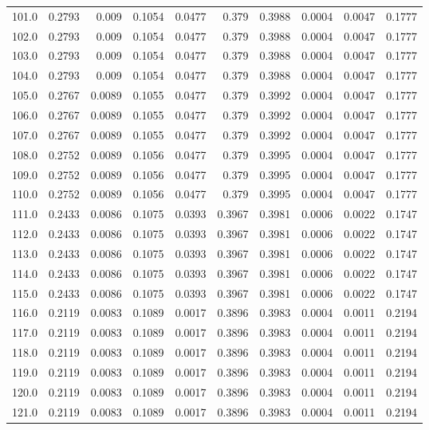 \begin{longtable}{lrrrrrrrrr}
101.0 & 0.2793 & 0.009 & 0.1054 & 0.0477 & 0.379 & 0.3988 & 0.0004 & 0.0047 & 0.1777 \\
102.0 & 0.2793 & 0.009 & 0.1054 & 0.0477 & 0.379 & 0.3988 & 0.0004 & 0.0047 & 0.1777 \\
103.0 & 0.2793 & 0.009 & 0.1054 & 0.0477 & 0.379 & 0.3988 & 0.0004 & 0.0047 & 0.1777 \\
104.0 & 0.2793 & 0.009 & 0.1054 & 0.0477 & 0.379 & 0.3988 & 0.0004 & 0.0047 & 0.1777 \\
105.0 & 0.2767 & 0.0089 & 0.1055 & 0.0477 & 0.379 & 0.3992 & 0.0004 & 0.0047 & 0.1777 \\
106.0 & 0.2767 & 0.0089 & 0.1055 & 0.0477 & 0.379 & 0.3992 & 0.0004 & 0.0047 & 0.1777 \\
107.0 & 0.2767 & 0.0089 & 0.1055 & 0.0477 & 0.379 & 0.3992 & 0.0004 & 0.0047 & 0.1777 \\
108.0 & 0.2752 & 0.0089 & 0.1056 & 0.0477 & 0.379 & 0.3995 & 0.0004 & 0.0047 & 0.1777 \\
109.0 & 0.2752 & 0.0089 & 0.1056 & 0.0477 & 0.379 & 0.3995 & 0.0004 & 0.0047 & 0.1777 \\
110.0 & 0.2752 & 0.0089 & 0.1056 & 0.0477 & 0.379 & 0.3995 & 0.0004 & 0.0047 & 0.1777 \\
111.0 & 0.2433 & 0.0086 & 0.1075 & 0.0393 & 0.3967 & 0.3981 & 0.0006 & 0.0022 & 0.1747 \\
112.0 & 0.2433 & 0.0086 & 0.1075 & 0.0393 & 0.3967 & 0.3981 & 0.0006 & 0.0022 & 0.1747 \\
113.0 & 0.2433 & 0.0086 & 0.1075 & 0.0393 & 0.3967 & 0.3981 & 0.0006 & 0.0022 & 0.1747 \\
114.0 & 0.2433 & 0.0086 & 0.1075 & 0.0393 & 0.3967 & 0.3981 & 0.0006 & 0.0022 & 0.1747 \\
115.0 & 0.2433 & 0.0086 & 0.1075 & 0.0393 & 0.3967 & 0.3981 & 0.0006 & 0.0022 & 0.1747 \\
116.0 & 0.2119 & 0.0083 & 0.1089 & 0.0017 & 0.3896 & 0.3983 & 0.0004 & 0.0011 & 0.2194 \\
117.0 & 0.2119 & 0.0083 & 0.1089 & 0.0017 & 0.3896 & 0.3983 & 0.0004 & 0.0011 & 0.2194 \\
118.0 & 0.2119 & 0.0083 & 0.1089 & 0.0017 & 0.3896 & 0.3983 & 0.0004 & 0.0011 & 0.2194 \\
119.0 & 0.2119 & 0.0083 & 0.1089 & 0.0017 & 0.3896 & 0.3983 & 0.0004 & 0.0011 & 0.2194 \\
120.0 & 0.2119 & 0.0083 & 0.1089 & 0.0017 & 0.3896 & 0.3983 & 0.0004 & 0.0011 & 0.2194 \\
121.0 & 0.2119 & 0.0083 & 0.1089 & 0.0017 & 0.3896 & 0.3983 & 0.0004 & 0.0011 & 0.2194 \\

\end{longtable}
